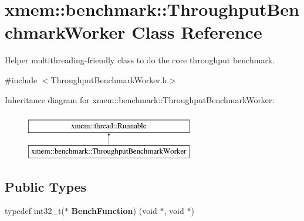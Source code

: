 \hypertarget{classxmem_1_1benchmark_1_1_throughput_benchmark_worker}{}\section{xmem\+:\+:benchmark\+:\+:Throughput\+Benchmark\+Worker Class Reference}
\label{classxmem_1_1benchmark_1_1_throughput_benchmark_worker}


Helper multithreading-\/friendly class to do the core throughput benchmark.  




{\ttfamily \#include $<$Throughput\+Benchmark\+Worker.\+h$>$}

Inheritance diagram for xmem\+:\+:benchmark\+:\+:Throughput\+Benchmark\+Worker\+:\begin{figure}[H]
\begin{center}
\leavevmode
\includegraphics[height=2.000000cm]{classxmem_1_1benchmark_1_1_throughput_benchmark_worker}
\end{center}
\end{figure}
\subsection*{Public Types}
\begin{DoxyCompactItemize}
\item 
\hypertarget{classxmem_1_1benchmark_1_1_throughput_benchmark_worker_a4604cb1fd7108eb9d56007bfb3c6e54f}{}typedef int32\+\_\+t($\ast$ {\bfseries Bench\+Function}) (void $\ast$, void $\ast$)\label{classxmem_1_1benchmark_1_1_throughput_benchmark_worker_a4604cb1fd7108eb9d56007bfb3c6e54f}

\end{DoxyCompactItemize}
